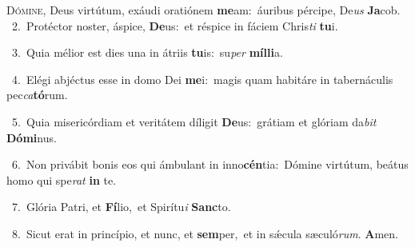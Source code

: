 \lettrine{\initial\textcolor{\initialcolor}{D}}{ómine,} Deus virtútum, exáudi oratiónem \textbf{me}\-am:~\star áuribus pércipe, De\textit{us} \textbf{Ja}\-cob.\\
{\numbfont\textcolor{\numbcolor}{~2.}}~Protéctor noster, áspice, \textbf{De}\-us:~\star et réspice in fáciem Chris\textit{ti} \textbf{tu}\-i.\par
{\numbfont\textcolor{\numbcolor}{~3.}}~Quia mélior est dies una in átriis \textbf{tu}\-is:~\star su\textit{per} \textbf{míl}\-\textbf{li}a.\par
{\numbfont\textcolor{\numbcolor}{~4.}}~Elégi abjéctus esse in domo Dei \textbf{me}\-i:~\star magis quam habitáre in tabernáculis pec\-\textit{ca}\-\textbf{tó}rum.\par
{\numbfont\textcolor{\numbcolor}{~5.}}~Quia misericórdiam et veritátem díligit \textbf{De}\-us:~\star grátiam et glóriam da\textit{bit} \textbf{Dó}\-\textbf{mi}nus.\par
{\numbfont\textcolor{\numbcolor}{~6.}}~Non privábit bonis eos qui ámbulant in inno\-\textbf{cén}\-tia:~\star Dómine virtútum, beátus homo qui spe\textit{rat} \textbf{in} te.\par
{\numbfont\textcolor{\numbcolor}{~7.}}~Glória Patri, et \textbf{Fí}\-lio,~\star et Spirítu\textit{i} \textbf{Sanc}\-to.\par
{\numbfont\textcolor{\numbcolor}{~8.}}~Sicut erat in princípio, et nunc, et \textbf{sem}\-per,~\star et in sǽcula sæculó\-\textit{rum}\-. \textbf{A}\-men.\par
